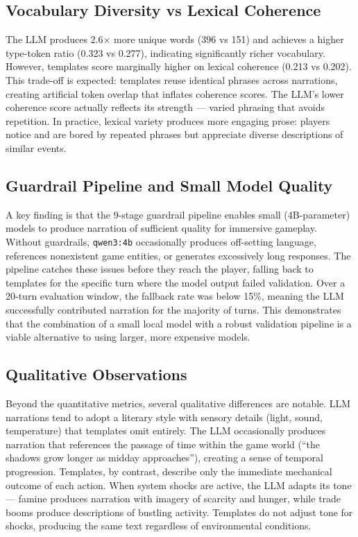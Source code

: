 \documentclass[12pt, a4paper, oneside]{report}
\begin{document}
\subsection{Vocabulary Diversity vs Lexical Coherence}

The LLM produces 2.6$\times$ more unique words (396 vs 151) and achieves a higher type-token ratio (0.323 vs 0.277), indicating significantly richer vocabulary. However, templates score marginally higher on lexical coherence (0.213 vs 0.202). This trade-off is expected: templates reuse identical phrases across narrations, creating artificial token overlap that inflates coherence scores. The LLM's lower coherence score actually reflects its strength --- varied phrasing that avoids repetition. In practice, lexical variety produces more engaging prose: players notice and are bored by repeated phrases but appreciate diverse descriptions of similar events.

\subsection{Guardrail Pipeline and Small Model Quality}

A key finding is that the 9-stage guardrail pipeline enables small (4B-parameter) models to produce narration of sufficient quality for immersive gameplay. Without guardrails, \texttt{qwen3:4b} occasionally produces off-setting language, references nonexistent game entities, or generates excessively long responses. The pipeline catches these issues before they reach the player, falling back to templates for the specific turn where the model output failed validation. Over a 20-turn evaluation window, the fallback rate was below 15\%, meaning the LLM successfully contributed narration for the majority of turns. This demonstrates that the combination of a small local model with a robust validation pipeline is a viable alternative to using larger, more expensive models.

\subsection{Qualitative Observations}

Beyond the quantitative metrics, several qualitative differences are notable. LLM narrations tend to adopt a literary style with sensory details (light, sound, temperature) that templates omit entirely. The LLM occasionally produces narration that references the passage of time within the game world (``the shadows grow longer as midday approaches''), creating a sense of temporal progression. Templates, by contrast, describe only the immediate mechanical outcome of each action. When system shocks are active, the LLM adapts its tone --- famine produces narration with imagery of scarcity and hunger, while trade booms produce descriptions of bustling activity. Templates do not adjust tone for shocks, producing the same text regardless of environmental conditions.
\end{document}
